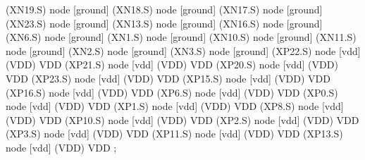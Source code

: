 \begin{circuitikz}[american]
	(XN19.S) node [ground] {}
	(XN18.S) node [ground] {}
	(XN17.S) node [ground] {}
	(XN23.S) node [ground] {}
	(XN13.S) node [ground] {}
	(XN16.S) node [ground] {}
	(XN6.S) node [ground] {}
	(XN1.S) node [ground] {}
	(XN10.S) node [ground] {}
	(XN11.S) node [ground] {}
	(XN2.S) node [ground] {}
	(XN3.S) node [ground] {}
	(XP22.S) node [vdd] (VDD) {VDD}
	(XP21.S) node [vdd] (VDD) {VDD}
	(XP20.S) node [vdd] (VDD) {VDD}
	(XP23.S) node [vdd] (VDD) {VDD}
	(XP15.S) node [vdd] (VDD) {VDD}
	(XP16.S) node [vdd] (VDD) {VDD}
	(XP6.S) node [vdd] (VDD) {VDD}
	(XP0.S) node [vdd] (VDD) {VDD}
	(XP1.S) node [vdd] (VDD) {VDD}
	(XP8.S) node [vdd] (VDD) {VDD}
	(XP10.S) node [vdd] (VDD) {VDD}
	(XP2.S) node [vdd] (VDD) {VDD}
	(XP3.S) node [vdd] (VDD) {VDD}
	(XP11.S) node [vdd] (VDD) {VDD}
	(XP13.S) node [vdd] (VDD) {VDD}
;

\end{circuitikz}
